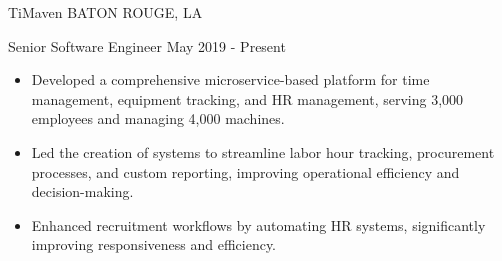 \documentclass[10pt,a4paper]{article}
\begin{document}







\spacedhrule{0em}{-1em}


\headedsection
{TiMaven}
{\textsc{BATON ROUGE, LA}}
{
  \headedsubsection
  {Senior Software Engineer}
  {May 2019 - Present}
  {
    \begin{itemize}
      \item Developed a comprehensive microservice-based platform for time management, equipment tracking, and HR management, serving 3,000 employees and managing 4,000 machines.
      \item Led the creation of systems to streamline labor hour tracking, procurement processes, and custom reporting, improving operational efficiency and decision-making.
      \item Enhanced recruitment workflows by automating HR systems, significantly improving responsiveness and efficiency.
    \end{itemize}
  }
}
\end{document}
